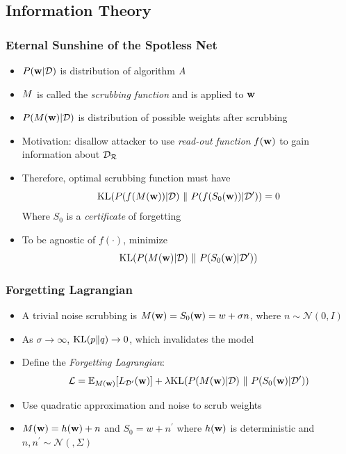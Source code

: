 \documentclass[pdf]{beamer}
\begin{document}
\subsection{Information Theory}
\begin{frame}
  \myNset[3]
  \smartart
\end{frame}

\begin{frame}
  \frametitle{
    Eternal Sunshine of the Spotless Net \cite{golatkarEternalSunshineSpotless2020}
    }
  \begin{itemize}
    \item $P(\textbf{w} | \mathcal{D})$ is distribution of algorithm $A$
    \item $M$ is called the \emph{scrubbing function} and is applied to $\textbf{w}$
    \item $P(M(\textbf{w})|\mathcal{D})$ is distribution of possible weights after scrubbing
    \item Motivation: disallow attacker to use \textit{read-out function} $f(\textbf{w})$ to gain information about $\mathcal{D_{R}}$
    \item Therefore, optimal scrubbing function must have 
    \[
      \text{KL}(P(f(M(\textbf{w}))|\mathcal{D})~\|~P(f(S_{0}(\textbf{w}))|\mathcal{D}^{\prime}))=0
    \]
    Where $S_{0}$ is a \textit{certificate} of forgetting
    \item To be agnostic of $f(\cdot)$, minimize
    \[
      \text{KL}(P(M(\textbf{w})|\mathcal{D})~\|~P(S_{0}(\textbf{w})|\mathcal{D}^{\prime})) 
    \]
  \end{itemize}
\end{frame}

\begin{frame}
  \frametitle{Forgetting Lagrangian}
  \begin{itemize}
    \item A trivial noise scrubbing is $M(\textbf{w})=S_{0}(\textbf{w}) = w+\sigma n$, where $n \sim \mathcal{N}(0,I)$
    \item As $\sigma \rightarrow \infty$, $\text{KL}(p\|q)\rightarrow 0$, which invalidates the model 
    \item Define the \emph{Forgetting Lagrangian}:
    \[
      \mathcal{L} = \mathbb{E}_{M(\textbf{w})}[L_{\mathcal{D}^{\prime}}(\textbf{w})] + \lambda\text{KL}(P(M(\textbf{w})|\mathcal{D})~\|~P(S_{0}(\textbf{w})|\mathcal{D}^{\prime})) 
    \]
    \item Use quadratic approximation and noise to scrub weights
    \item $M(\textbf{w}) = h(\textbf{w})+n$ and $S_{0}=w + n^{\prime}$ where $h(\textbf{w})$ is deterministic and $n,n^{\prime} \sim \mathcal{N}(,\Sigma)$
  \end{itemize}

\end{frame}
\end{document}
